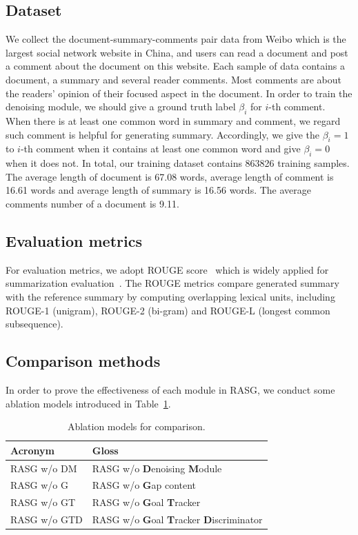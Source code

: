 \documentclass[letterpaper]{article} %
\begin{document}
\subsection{Dataset}

We collect the document-summary-comments pair data from Weibo which is the largest social network website in China, and users can read a document and post a comment about the document on this website.
Each sample of data contains a document, a summary and several reader comments.
Most comments are about the readers' opinion of their focused aspect in the document.
In order to train the denoising module, we should give a ground truth label $\beta_i$ for $i$-th comment.
When there is at least one common word in summary and comment, we regard such comment is helpful for generating summary.
Accordingly, we give the $\beta_i = 1$ to $i$-th comment when it contains at least one common word and give $\beta_i = 0$ when it does not.
In total, our training dataset contains 863826 training samples.
The average length of document is 67.08 words, average length of comment is 16.61 words and average length of summary is 16.56 words.
The average comments number of a document is 9.11.

\subsection{Evaluation metrics}

For evaluation metrics, we adopt ROUGE score~\cite{lin2004rouge} which is widely applied for summarization evaluation~\cite{Sun2018AUM,chen2018iterative}.
The ROUGE metrics compare generated summary with the reference summary by computing overlapping lexical units, including ROUGE-1 (unigram), ROUGE-2 (bi-gram) and ROUGE-L (longest common subsequence).

\subsection{Comparison methods}

In order to prove the effectiveness of each module in RASG, we conduct some ablation models introduced in Table~\ref{tab:ablations}.

\begin{table}[t]
\centering
\caption{Ablation models for comparison.}
\label{tab:ablations}
\small
\begin{tabular}{@{}l@{~}l}
\toprule
Acronym & Gloss \\
\midrule
RASG w/o DM &  \multicolumn{1}{p{5cm}}{\small RASG w/o \textbf{D}enoising \textbf{M}odule}\\
RASG w/o G &  \multicolumn{1}{p{5cm}}{\small RASG w/o \textbf{G}ap content}\\
RASG w/o GT &  \multicolumn{1}{p{5cm}}{\small RASG w/o \textbf{G}oal \textbf{T}racker}\\
RASG w/o GTD &  \multicolumn{1}{p{5cm}}{\footnotesize RASG w/o \textbf{G}oal \textbf{T}racker \textbf{D}iscriminator}\\
\bottomrule
\end{tabular}
\end{table}
\end{document}
